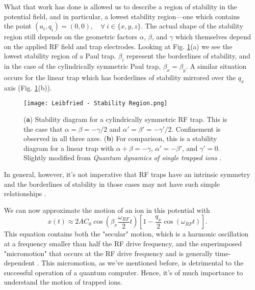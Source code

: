 What that work has done is allowed us to describe a region of stability in the potential field, and in particular, a lowest stability region---one which contains the point $(a_i, q_i) = (0,0), \quad \forall \: i \in \{x, y, z\}$. The actual shape of the stability region still depends on the geometric factors $\alpha$, $\beta$, and $\gamma$ which themselves depend on the applied RF field and trap electrodes. Looking at Fig. \ref{fig:Stability Region}(a) we see the lowest stability region of a Paul trap. $\beta_i$ represent the borderlines of stability, and in the case of the cylindrically symmetric Paul trap, $\beta_x = \beta_y$. A similar situation occurs for the linear trap which has borderlines of stability mirrored over the $q_x$ axis (Fig. \ref{fig:Stability Region}(b)).
\begin{figure}[h]
    \texttt{[image: Leibfried - Stability Region.png]}
    \caption{(\textbf{a}) Stability diagram for a cylindrically symmetric RF trap. This is the case that $\alpha=\beta = -\gamma/2$ and $\alpha'=\beta' = -\gamma'/2$. Confinement is observed in all three axes. (\textbf{b}) For comparison, this is a stability diagram for a linear trap with $\alpha+\beta = -\gamma$, $\alpha' = -\beta'$, and $\gamma'=0$. Slightly modified from \textit{Quantum dynamics of single trapped ions} \cite{Leibfried}.}
    \label{fig:Stability Region}
\end{figure}
In general, however, it's not imperative that RF traps have an intrinsic symmetry and the borderlines of stability in those cases may not have such simple relationships \cite{Leibfried}.

We can now approximate the motion of an ion in this potential with
\begin{equation}
    x(t) \approx 2AC_0 \cos\left( \beta_x \frac{\omega_{RF}}{2} t \right) \left[ 1 - \frac{q_x}{2} \cos(\omega_{RF} t) \right].
\end{equation}
This equation contains both the "secular" motion, which is a harmonic oscillation at a frequency smaller than half the RF drive frequency, and the superimposed "micromotion" that occurs at the RF drive frequency and is generally time-dependent \cite{Bruzewicz}. This micromotion, as we've mentioned before, is detrimental to the successful operation of a quantum computer. Hence, it's of much importance to understand the motion of trapped ions.
